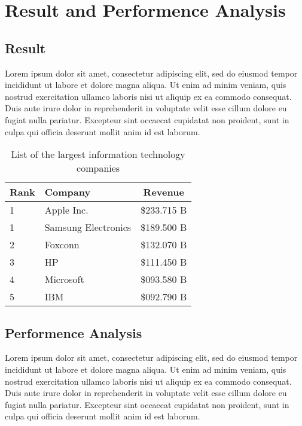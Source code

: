 \documentclass[document.tex]{subfiles}
\begin{document}
\chapter{Result and Performence Analysis}

\section{Result}

\noindent Lorem ipsum dolor sit amet, consectetur adipiscing elit, sed do eiusmod tempor incididunt ut labore et dolore magna aliqua. Ut enim ad minim veniam, quis nostrud exercitation ullamco laboris nisi ut aliquip ex ea commodo consequat. Duis aute irure dolor in reprehenderit in voluptate velit esse cillum dolore eu fugiat nulla pariatur. Excepteur sint occaecat cupidatat non proident, sunt in culpa qui officia deserunt mollit anim id est laborum.\newline

\begin{table}[H]
        \caption{List of the largest information technology companies}
        \begin{center}
                \begin{tabular}{|l|l|c|}\hline
                        Rank & Company             & Revenue     \\ \hline
                        1    & Apple Inc.          & \$233.715 B \\ \hline
                        1    & Samsung Electronics & \$189.500 B \\ \hline
                        2    & Foxconn             & \$132.070 B \\ \hline
                        3    & HP                  & \$111.450 B \\ \hline
                        4    & Microsoft           & \$093.580 B \\ \hline
                        5    & IBM                 & \$092.790 B \\ \hline
                \end{tabular}
        \end{center}
        \label{tab:result}
\end{table}

\section{Performence Analysis}
\noindent Lorem ipsum dolor sit amet, consectetur adipiscing elit, sed do eiusmod tempor incididunt ut labore et dolore magna aliqua. Ut enim ad minim veniam, quis nostrud exercitation ullamco laboris nisi ut aliquip ex ea commodo consequat. Duis aute irure dolor in reprehenderit in voluptate velit esse cillum dolore eu fugiat nulla pariatur. Excepteur sint occaecat cupidatat non proident, sunt in culpa qui officia deserunt mollit anim id est laborum.
\end{document}
